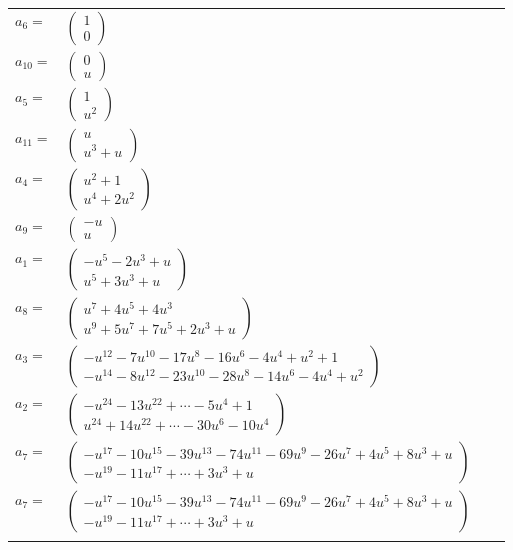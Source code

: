 \documentclass[1p]{elsarticle_modified}
\theoremstyle{definition}
\begin{document}
\begin{tabular}{m{7pt} m{180pt} m{7pt} m{180pt} }
\flushright $a_{6}=$&$\begin{pmatrix}1\\0\end{pmatrix}$ \\
\flushright $a_{10}=$&$\begin{pmatrix}0\\u\end{pmatrix}$ \\
\flushright $a_{5}=$&$\begin{pmatrix}1\\u^2\end{pmatrix}$ \\
\flushright $a_{11}=$&$\begin{pmatrix}u\\u^3+u\end{pmatrix}$ \\
\flushright $a_{4}=$&$\begin{pmatrix}u^2+1\\u^4+2 u^2\end{pmatrix}$ \\
\flushright $a_{9}=$&$\begin{pmatrix}- u\\u\end{pmatrix}$ \\
\flushright $a_{1}=$&$\begin{pmatrix}- u^5-2 u^3+u\\u^5+3 u^3+u\end{pmatrix}$ \\
\flushright $a_{8}=$&$\begin{pmatrix}u^7+4 u^5+4 u^3\\u^9+5 u^7+7 u^5+2 u^3+u\end{pmatrix}$ \\
\flushright $a_{3}=$&$\begin{pmatrix}- u^{12}-7 u^{10}-17 u^8-16 u^6-4 u^4+u^2+1\\- u^{14}-8 u^{12}-23 u^{10}-28 u^8-14 u^6-4 u^4+u^2\end{pmatrix}$ \\
\flushright $a_{2}=$&$\begin{pmatrix}- u^{24}-13 u^{22}+\cdots-5 u^4+1\\u^{24}+14 u^{22}+\cdots-30 u^6-10 u^4\end{pmatrix}$ \\
\flushright $a_{7}=$&$\begin{pmatrix}- u^{17}-10 u^{15}-39 u^{13}-74 u^{11}-69 u^9-26 u^7+4 u^5+8 u^3+u\\- u^{19}-11 u^{17}+\cdots+3 u^3+u\end{pmatrix}$\\ \flushright $a_{7}=$&$\begin{pmatrix}- u^{17}-10 u^{15}-39 u^{13}-74 u^{11}-69 u^9-26 u^7+4 u^5+8 u^3+u\\- u^{19}-11 u^{17}+\cdots+3 u^3+u\end{pmatrix}$\\&\end{tabular}
\end{document}
